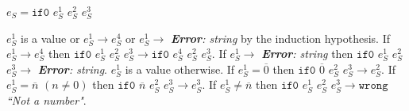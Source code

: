 \begin{case}

$e_{S}=\mathtt{if0}$ $e_{S}^{1}$ $e_{S}^{2}$ $e_{S}^{3}$

$e_{S}^{1}$ is a value or $e_{S}^{1}\rightarrow e_{S}^{4}$ or $e_{S}^{1}\rightarrow$ \emph{\textbf{Error}: string} by the induction hypothesis.  If $e_{S}^{1}\rightarrow e_{S}^{4}$ then $\mathtt{if0}$ $e_{S}^{1}$ $e_{S}^{2}$ $e_{S}^{3}\rightarrow \mathtt{if0}$ $e_{S}^{4}$ $e_{S}^{2}$ $e_{S}^{3}$.  If $e_{S}^{1}\rightarrow$ \emph{\textbf{Error}: string} then $\mathtt{if0}$ $e_{S}^{1}$ $e_{S}^{2}$ $e_{S}^{3}\rightarrow$ \emph{\textbf{Error}: string}.  $e_{S}^{1}$ is a value otherwise.  If $e_{S}^{1}=\overline{0}$ then $\mathtt{if0}$ $\overline{0}$ $e_{S}^{2}$ $e_{S}^{3}\rightarrow e_{S}^{2}$.  If $e_{S}^{1}=\overline{n}$ $(n\neq 0)$ then $\mathtt{if0}$ $\overline{n}$ $e_{S}^{2}$ $e_{S}^{3}\rightarrow e_{S}^{3}$.  If $e_{S}^{1}\neq\overline{n}$ then $\mathtt{if0}$ $e_{S}^{1}$ $e_{S}^{2}$ $e_{S}^{3}\rightarrow\mathtt{wrong}$ \emph{``Not a number"}.

\end{case}